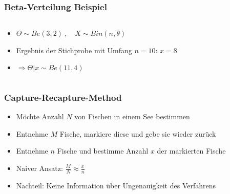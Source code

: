 \documentclass[aspectratio=169,xcolor=dvipsnames]{beamer}
\begin{document}
\begin{frame}
\frametitle{Beta-Verteilung Beispiel}
\begin{columns}
	\begin{column}{0.5\textwidth}
		\begin{itemize}
			\item<1-> $\Theta\sim Be(3,2)~,\quad X\sim Bin(n,\theta)$
			\item<2-> Ergebnis der Stichprobe mit Umfang $n=10$: $x=8$
			\item<3-> $\Rightarrow \Theta|x\sim Be(11,4)$
		\end{itemize}
	\end{column}
	\begin{column}{0.5\textwidth}
		\begin{figure}
		\end{figure}
	\end{column}
\end{columns}
\end{frame}

\begin{frame}
\frametitle{Capture-Recapture-Method}
\begin{itemize}
	\item<1-> Möchte Anzahl $N$ von Fischen in einem See bestimmen
	\item<2-> Entnehme $M$ Fische, markiere diese und gebe sie wieder zurück
	\item<3-> Entnehme $n$ Fische und bestimme Anzahl $x$ der markierten Fische
	\item<4-> Naiver Ansatz: $\frac{M}{N}\approx \frac{x}{n}$
	\item<5-> Nachteil: Keine Information über Ungenauigkeit des Verfahrens
\end{itemize}
\end{frame}
\end{document}
